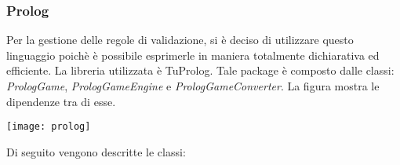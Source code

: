 \subsubsection{Prolog}
Per la gestione delle regole di validazione, si è deciso di utilizzare questo linguaggio poichè è possibile esprimerle in maniera totalmente dichiarativa ed efficiente. La libreria utilizzata è TuProlog.
\newline
\newline Tale package è composto dalle classi: \textit{PrologGame}, \textit{PrologGameEngine} e \textit{PrologGameConverter}. La figura mostra le dipendenze tra di esse.\newline
\begin{center}
    \texttt{[image: prolog]}
\end{center}
Di seguito vengono descritte le classi:
